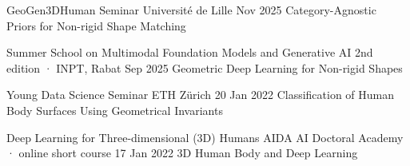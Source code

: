 
\CVTalk
  {GeoGen3DHuman Seminar}
  {Université de Lille}
  {Nov 2025}
  {Category-Agnostic Priors for Non-rigid Shape Matching}

\CVTalk
  {Summer School on Multimodal Foundation Models and Generative AI}
  {2nd edition · INPT, Rabat}
  {Sep 2025}
  {Geometric Deep Learning for Non-rigid Shapes}

\CVTalk
  {Young Data Science Seminar}
  {ETH Zürich}
  {20 Jan 2022}
  {Classification of Human Body Surfaces Using Geometrical Invariants}

\CVTalk
  {Deep Learning for Three-dimensional (3D) Humans}
  {AIDA AI Doctoral Academy · online short course}
  {17 Jan 2022}
  {3D Human Body and Deep Learning}

